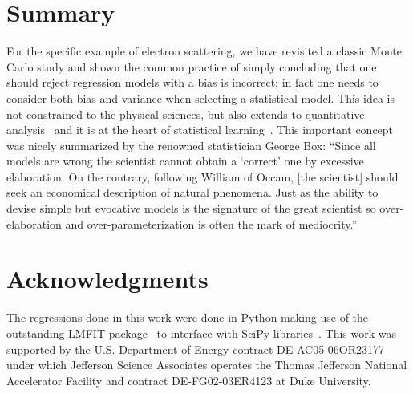 \documentclass[10pt,aps,prc,twocolumn]{revtex4-1}
\begin{document}
\section{Summary}

For the specific example of electron scattering, we have revisited a classic Monte Carlo study and shown
the common practice of simply concluding that one should reject regression models with a bias is incorrect; 
in fact one needs to consider both bias and variance when selecting a statistical model.   
This idea is not constrained to the physical sciences, but also extends 
to quantitative analysis~\cite{Brighton:2015} and it is at the heart of statistical 
learning~\cite{Hastie:2009}.
This important concept was nicely summarized by the renowned statistician George Box: 
``Since all models are wrong the scientist cannot obtain a `correct' one
by excessive elaboration.  On the contrary, following William of Occam, 
[the scientist] should seek an economical description of natural phenomena. 
Just as the ability to devise simple but evocative models is the signature of the
great scientist so over-elaboration and over-parameterization is often
the mark of mediocrity.''~\cite{Box76}


\section{Acknowledgments}

The regressions done in this work were done in Python making use of the
outstanding LMFIT package~\cite{Newville:2014} to interface with SciPy
libraries~\cite{Jones:2001}.
This work was supported by the U.S.  Department of Energy contract DE-AC05-06OR23177
under which Jefferson Science Associates operates the Thomas Jefferson National 
Accelerator Facility and contract DE-FG02-03ER4123 at Duke University.


\end{document}
